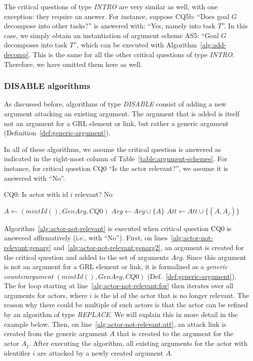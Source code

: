 The critical questions of type \emph{INTRO} are very similar as well, with one exception: they require an answer. For instance, suppose CQ5b: ``Does goal $G$ decompose into other tasks?'' is answered with: ``Yes, namely into task $T$''. In this case, we simply obtain an instantiation of argument scheme AS5: ``Goal $G$ decomposes into task $T$'', which can be executed with Algorithm~\ref{alg:add-decomp}. This is the same for all the other critical questions of type \emph{INTRO}. Therefore, we have omitted them here as well.

\subsubsection{DISABLE algorithms}
\label{sect:formalframework:disable}
As discussed before, algorithms of type \emph{DISABLE} consist of adding a new argument attacking an existing argument. The argument that is added is itself not an argument for a GRL element or link, but rather a generic argument (Definition~\ref{def:generic-argument}).

In all of these algorithms, we assume the critical question is answered as indicated in the right-most column of Table~\ref{table:argument-schemes}. For instance, for critical question CQ0 ``Is the actor relevant?'', we assume it is answered with ``No''.

\begin{algorithm}[h]
  \caption{CQ0: Is actor with id $i$ relevant? No}\label{alg:actor-not-relevant}
  \begin{algorithmic}[1]
    \State $A \leftarrow (mintId(),GenArg,CQ0)$\label{alg:actor-not-relevant:genarg}
    \State $Arg\leftarrow Arg \cup \{A\}$\label{alg:actor-not-relevant:genarg2}
    \label{alg:actor-not-relevant:for}
      \State $Att \leftarrow Att \cup \{(A,A_j)\}$\label{alg:actor-not-relevant:att}
    \EndFor
    \EndProcedure
  \end{algorithmic}
\end{algorithm}

Algorithm~\ref{alg:actor-not-relevant} is executed when critical question CQ0 is answered affirmatively (i.e., with ``No''). First, on lines~\ref{alg:actor-not-relevant:genarg} and~\ref{alg:actor-not-relevant:genarg2}, an argument is created for the critical question and added to the set of arguments $Arg$. Since this argument is not an argument for a GRL element or link, it is formalized as a \emph{generic counterargument} $(mintId(), GenArg, CQ0)$ (Def.~\ref{def:generic-argument}). The for loop starting at line~\ref{alg:actor-not-relevant:for} then iterates over all arguments for actors, where $i$ is the id of the actor that is no longer relevant. The reason why there could be multiple of such actors is that the actor can be refined by an algorithm of type \emph{REPLACE}. We will explain this in more detail in the example below. Then, on line~\ref{alg:actor-not-relevant:att}, an attack link is created from the generic argument $A$ that is created to the argument for the actor $A_j$. After executing the algorithm, all existing arguments for the actor with identifier $i$ are attacked by a newly created argument $A$.

